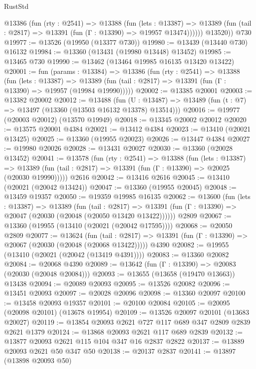\begin{lexlean}{RustStd}
\begin{coremodule}
          @13386
            (fun (rty : @2541) =>
            @13388
              (fun (lets : @13387) =>
              @13389 (fun (tail : @2817) => @13391 (fun (Γ : @13390) => @19957 @13474))))))
        @13520))
    @730
@19977 := @13526 (@19950 (@13377 @730))
@19980 := @13439 (@13440 @730) @16132
@19984 := @13360 (@13431 (@19980 @13448) @13452)
@19985 := @13465 @730
@19990 := @13462 (@13464 @19985 @16135 @13420 @13422)
@20001 := fun (params : @13384) =>
  @13386
    (fun (rty : @2541) =>
    @13388
      (fun (lets : @13387) =>
      @13389 (fun (tail : @2817) => @13391 (fun (Γ : @13390) => @19957 (@19984 @19990)))))
@20002 := @13385 @20001
@20003 := @13382 @20002
@20012 := @13488
    (fun (U : @13487) => @13489 (fun (t : @7) => @13497 (@13360 (@13503 @16132 @13378) @13514)))
@20016 := @19977 (@20003 @20012) (@13570 @19949)
@20018 := @13345 @20002 @20012
@20020 := @13575 @20001 @4384
@20021 := @13412 @4384
@20023 := @13410 (@20021 @13425)
@20025 := @13360 (@19955 @20023)
@20026 := @13447 @4384
@20027 := @19980 @20026
@20028 := @13431 @20027
@20030 := @13360 (@20028 @13452)
@20041 := @13578
    (fun (rty : @2541) =>
    @13388
      (fun (lets : @13387) =>
      @13389 (fun (tail : @2817) => @13391 (fun (Γ : @13390) => @20025 (@20030 @19990)))))
    @2616
@20042 := @13416 @2616
@20045 := @13410 (@20021 (@20042 @13424))
@20047 := @13360 (@19955 @20045)
@20048 := @13459 @19357
@20050 := @19359 @19985 @16135
@20062 := @13600
    (fun (lets : @13387) =>
    @13389
      (fun (tail : @2817) =>
      @13391 (fun (Γ : @13390) => @20047 (@20030 (@20048 (@20050 @13420 @13422))))))
    @2809
@20067 := @13360 (@19955 (@13410 (@20021 (@20042 @17595))))
@20068 := @20050 @2809
@20077 := @13624
    (fun (tail : @2817) => @13391 (fun (Γ : @13390) => @20067 (@20030 (@20048 (@20068 @13422)))))
    @4390
@20082 := @19955 (@13410 (@20021 (@20042 (@13419 @4391))))
@20083 := @13360 @20082
@20084 := @20068 @4390
@20089 := @13642 (fun (Γ : @13390) => @20083 (@20030 (@20048 @20084)))
@20093 := @13655 (@13658 (@19470 @13663)) @13438
@20094 := @20089 @20093
@20095 := @13526 @20082
@20096 := @13451 @20093
@20097 := @20028 @20096
@20098 := @13360 @20097
@20100 := @13458 @20093 @19357
@20101 := @20100 @20084
@20105 := @20095 (@20098 @20101) (@13678 @19954)
@20109 := @13526 @20097 @20101 (@13683 @20027)
@20119 := @13854 @20093 @2621 @727 @117 @689 @347 @2809 @2839 @2621 @1379
@20124 := @13868 @20093 @2621 @117 @689 @2839
@20132 := @13877 @20093 @2621 @115 @104 @347 @16 @2837 @2822
@20137 := @13889 @20093 @2621 @50 @347 @50
@20138 := @20137 @2837
@20141 := @13897 (@13898 @20093 @50)

\end{coremodule}
\end{lexlean}
